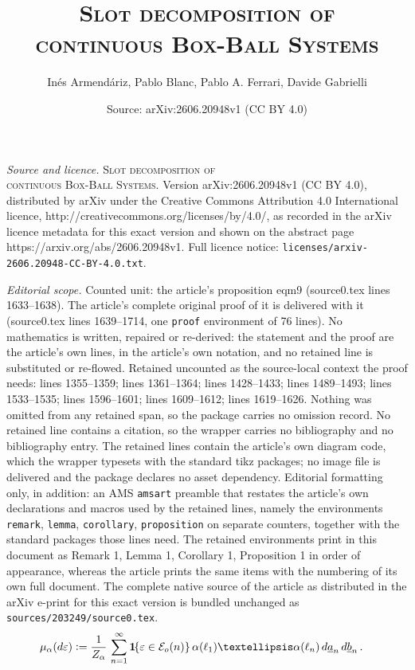 \documentclass[10pt,a4paper]{amsart}
\title{\textsc{Slot decomposition of\\ continuous Box-Ball Systems}}
\author{In\'es Armend\'ariz, Pablo Blanc, Pablo A. Ferrari, Davide Gabrielli}
\date{Source: arXiv:2606.20948v1 (CC BY 4.0)}
\newcommand{\cE}{\mathcal E}
\newcommand{\one}{{\bf 1}\hskip-.5mm} %
\newcommand{\ua}{\underline a}
\newcommand{\ub}{\underline b}
\newcommand{\vep}{\varepsilon}
\begin{document}
\maketitle

\noindent\emph{Source and licence.} \textsc{Slot decomposition of\\ continuous Box-Ball Systems}. Version arXiv:2606.20948v1 (CC BY 4.0), distributed by arXiv under the Creative Commons Attribution 4.0 International licence, http://creativecommons.org/licenses/by/4.0/, as recorded in the arXiv licence metadata for this exact version and shown on the abstract page https://arxiv.org/abs/2606.20948v1. Full licence notice: \texttt{licenses/arxiv-2606.20948-CC-BY-4.0.txt}.\par\smallskip

\noindent\textit{Editorial scope.} Counted unit: the article's proposition eqm9 (source0.tex lines 1633--1638). The article's complete original proof of it is delivered with it (source0.tex lines 1639--1714, one \texttt{proof} environment of 76 lines). No mathematics is written, repaired or re-derived: the statement and the proof are the article's own lines, in the article's own notation, and no retained line is substituted or re-flowed.  Retained uncounted as the source-local context the proof needs: lines 1355--1359; lines 1361--1364; lines 1428--1433; lines 1489--1493; lines 1533--1535; lines 1596--1601; lines 1609--1612; lines 1619--1626.  Nothing was omitted from any retained span, so the package carries no omission record.  No retained line contains a citation, so the wrapper carries no bibliography and no bibliography entry.  The retained lines contain the article's own diagram code, which the wrapper typesets with the standard tikz packages; no image file is delivered and the package declares no asset dependency.  Editorial formatting only, in addition: an AMS \texttt{amsart} preamble that restates the article's own declarations and macros used by the retained lines, namely the environments \texttt{remark}, \texttt{lemma}, \texttt{corollary}, \texttt{proposition} on separate counters, together with the standard packages those lines need.  The retained environments print in this document as Remark 1, Lemma 1, Corollary 1, Proposition 1 in order of appearance, whereas the article prints the same items with the numbering of its own full document.  The complete native source of the article as distributed in the arXiv e-print for this exact version is bundled unchanged as \texttt{sources/203249/source0.tex}.
\begin{align}
	\label{mua1}
	\mu_\alpha(d\varepsilon)
  &\vcentcolon =\frac{1}{Z_\alpha}\, \sum_{n=1}^\infty\one\{\vep\in\cE_o(n)\}\, \alpha(\ell_1)\dots\alpha(\ell_n)\, d\ua_n\, d\ub_{n}\,.
    \end{align}
\end{document}
